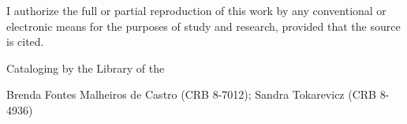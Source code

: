 

\imprimircapa


\imprimirfolhaderosto


\begin{fichacatalografica}
I authorize the full or partial reproduction of this work by any conventional or electronic means for the purposes of study and research, provided that the source is cited.
\ABNTEXfontereduzida

\vfill
\begin{center}
Cataloging by the Library of the {\imprimirescola}

Brenda Fontes Malheiros de Castro (CRB 8-7012); Sandra Tokarevicz (CRB 8-4936)

\medskip
\setlength{\fboxsep}{1cm}
\end{center}
\end{fichacatalografica}

